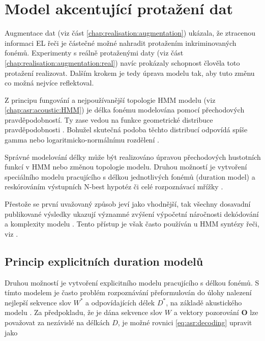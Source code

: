 \section{Model akcentující protažení dat}
\label{chap:realisation:durationmodels}

Augmentace dat (viz část \ref{chap:realisation:augmentation}) ukázala, že ztracenou informaci EL řeči je částečné možné nahradit protažením inkriminovaných fonémů. Experimenty s reálně protaženými daty (viz část \ref{chap:realisation:augmentation:real}) navíc prokázaly schopnost člověla toto protažení realizovat. Dalším krokem je tedy úprava modelu tak, aby tuto změnu co možná nejvíce reflektoval.

Z principu fungování a nejpoužívanější topologie HMM modelu (viz \ref{chap:asr:acoustic:HMM}) je délka fonému modelována pomocí přechodových pravděpodobností. Ty zase vedou na funkce geometrické distribuce pravděpodobnosti \cite{Rabiner1989}. Bohužel skutečná podoba těchto distribucí odpovídá spíše gamma nebo logaritmicko-normálnímu rozdělení \cite{Alumae2014}.

Správné modelování délky může být realizováno úpravou přechodových hustotních funkcí v HMM nebo změnou topologie modelu. Druhou možností je vytvoření speciálního modelu pracujícího s délkou jednotlivých fonémů (duration model) a reskórováním výstupních N-best hypotéz či celé rozpoznávací mřížky \cite{Alumae2014} \cite{Anastasakos1995} \cite{Gadde2000}.

Přestože se první uvažovaný způsob jeví jako vhodnější, tak všechny dosavadní publikované výsledky ukazují významné zvýšení výpočetní náročnosti dekódování a komplexity modelu \cite{Rabiner1989} \cite{Pylkkonen2004} \cite{Russell1985}. Tento přístup je však často používán u HMM syntézy řeči, viz \cite{Yoshimura1998}.

\subsection{Princip explicitních duration modelů}
\label{chap:realisation:durationmodels:model}

Druhou možností je vytvoření explicitního modelu pracujícího s délkou fonémů. S tímto modelem je často problém rozpoznávání přeformulován do úlohy nalezení nejlepší sekvence slov $W^{*}$ a odpovídajících délek $D^{*}$, na základě akustického modelu \cite{Alumae2014}. Za předpokladu, že je dána sekvence slov $W$ a vektory pozorování $\boldsymbol{O}$ lze považovat za nezávislé na délkách $D$, je možné rovnici \ref{eq:asr:decoding} upravit jako

